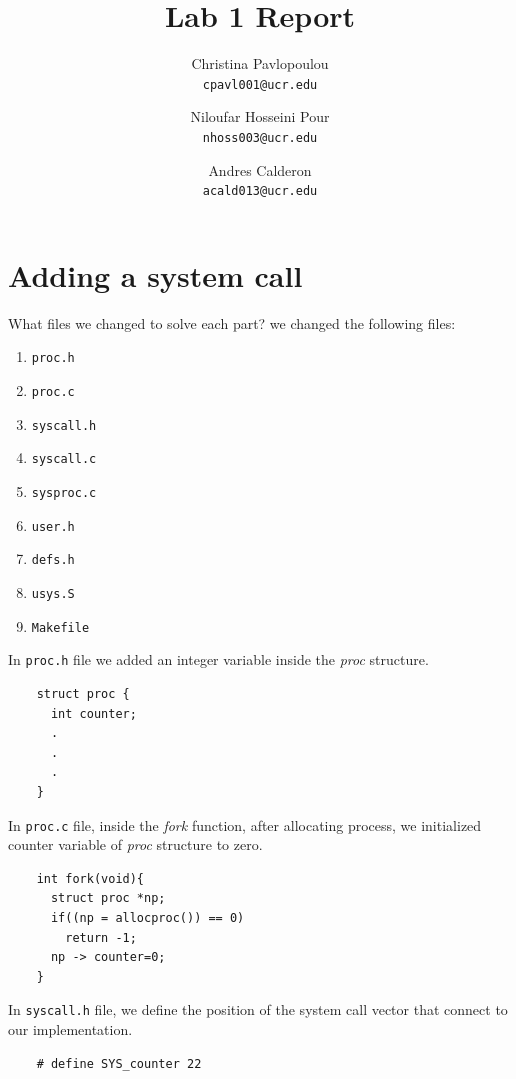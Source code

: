 \documentclass[10pt]{scrartcl}
\title{Lab 1 Report}
\author{
   Christina Pavlopoulou\\
  \small \texttt{cpavl001@ucr.edu}
  \and
   Niloufar Hosseini Pour\\
  \small \texttt{nhoss003@ucr.edu}
  \and
   Andres Calderon\\
  \small \texttt{acald013@ucr.edu}
}
\begin{document}
\maketitle

\section{Adding a system call}\label{sec:sc}
What files we changed to solve each part? we changed the following files:
\begin{enumerate}
 \item \texttt{proc.h}
 \item \texttt{proc.c}
 \item \texttt{syscall.h}
 \item \texttt{syscall.c}
 \item \texttt{sysproc.c}
 \item \texttt{user.h}
 \item \texttt{defs.h}
 \item \texttt{usys.S}
 \item \texttt{Makefile}
\end{enumerate}

In \texttt{proc.h} file we added an integer variable inside the \textit{proc} structure.

 \begin{verbatim}
    struct proc {
      int counter;
      .
      .
      .
    }
\end{verbatim}

In \texttt{proc.c} file, inside the \textit{fork} function, after allocating process, we initialized counter variable of \textit{proc} structure to zero.
 \begin{verbatim}
    int fork(void){
      struct proc *np;
      if((np = allocproc()) == 0)
        return -1;
      np -> counter=0;
    }
\end{verbatim}

In \texttt{syscall.h} file, we define the position of the system call vector that connect to our implementation.
 \begin{verbatim}
    # define SYS_counter 22
\end{verbatim}
\end{document}
